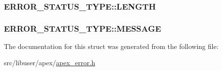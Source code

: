 \subsubsection[{\texorpdfstring{L\+E\+N\+G\+TH}{LENGTH}}]{ E\+R\+R\+O\+R\+\_\+\+S\+T\+A\+T\+U\+S\+\_\+\+T\+Y\+P\+E\+::\+L\+E\+N\+G\+TH}\hypertarget{structERROR__STATUS__TYPE_a85fdbf6cbc8aaf3c4bcf7f05bf6ded21}{}\label{structERROR__STATUS__TYPE_a85fdbf6cbc8aaf3c4bcf7f05bf6ded21}
\subsubsection[{\texorpdfstring{M\+E\+S\+S\+A\+GE}{MESSAGE}}]{ E\+R\+R\+O\+R\+\_\+\+S\+T\+A\+T\+U\+S\+\_\+\+T\+Y\+P\+E\+::\+M\+E\+S\+S\+A\+GE}\hypertarget{structERROR__STATUS__TYPE_a00202dd31a514e177d9bba92ee43d9d0}{}\label{structERROR__STATUS__TYPE_a00202dd31a514e177d9bba92ee43d9d0}


The documentation for this struct was generated from the following file\+:\begin{DoxyCompactItemize}
\item 
src/libuser/apex/\hyperlink{apex__error_8h}{apex\+\_\+error.\+h}\end{DoxyCompactItemize}
